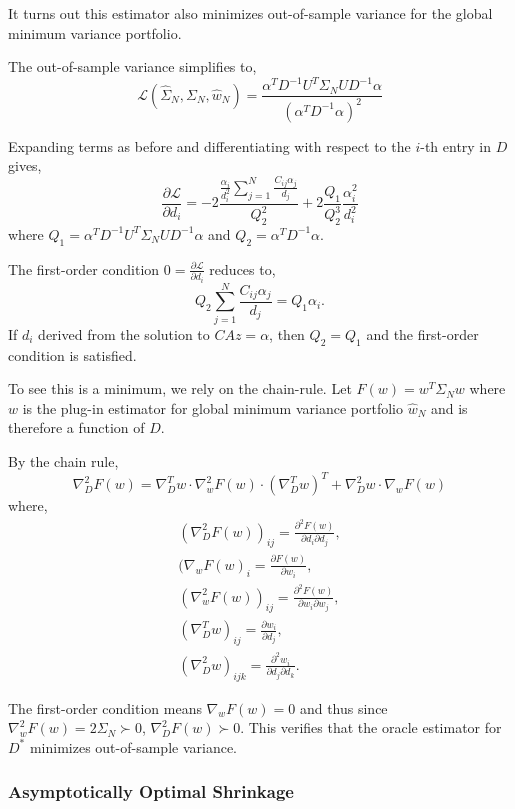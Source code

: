 \documentclass{article}
\begin{document}
It turns out this estimator also minimizes out-of-sample variance for the global
minimum variance portfolio.  

The out-of-sample variance simplifies to,
$$
  \mathcal{L}(\hat{\Sigma}_N, \Sigma_N, \hat{w}_N) = \frac
  	{\alpha^T D^{-1} U^T \Sigma_N U D^{-1} \alpha}
  	{\left( \alpha^T D^{-1} \alpha\right)^2}
$$

Expanding terms as before and differentiating with respect to the $i$-th entry
in $D$ gives,
$$
  \frac{\partial\mathcal{L}}{\partial d_i} = -2 \frac
  	{ \frac{\alpha_i}{d_i^2} \sum_{j=1}^N \frac{C_{ij}\alpha_j}{d_j} }{ Q_2^2 }
    + 2\frac{ Q_1 }{ Q_2^3 } \frac{\alpha_i^2}{d_i^2}
$$
where $Q_1 = \alpha^T D^{-1} U^T \Sigma_N U D^{-1} \alpha$ and $Q_2 = \alpha^T
D^{-1} \alpha$.

The first-order condition $0 = \frac{\partial\mathcal{L}}{\partial d_i}$ reduces
to,
$$
  Q_2 \sum_{j=1}^N \frac{C_{ij}\alpha_j}{d_j}
   = Q_1 \alpha_i.
$$
If $d_i$ derived from the solution to $C A z = \alpha$, then $Q_2 = Q_1$ and the
first-order condition is satisfied.

To see this is a minimum, we rely on the chain-rule.  Let $F(w) = w^T \Sigma_N
w$ where $w$ is the plug-in estimator for global minimum variance portfolio
$\hat{w}_N$ and is therefore a function of $D$.

By the chain rule,
$$
	\nabla_D^2 F(w)
		 = \nabla_D^T w \cdot \nabla_w^2 F(w) \cdot (\nabla_D^T w)^T
		 	+ \nabla_D^2 w \cdot \nabla_w F(w)
$$
where,
\begin{gather*}
	(\nabla_D^2 F(w))_{ij} = \frac{\partial^2 F(w)}
																{\partial d_i \partial d_j},\\
	(\nabla_w F(w)_{i} = \frac{\partial F(w)}{\partial w_i},\\	
	(\nabla_w^2 F(w))_{ij} = \frac{\partial^2 F(w)}
																{\partial w_i \partial w_j},\\									
	(\nabla_D^T w)_{ij} = \frac{\partial w_i}{\partial d_j},\\													
	(\nabla_D^2 w)_{ijk} = \frac{\partial^2 w_i}
																{\partial d_j\partial d_k}.
\end{gather*}

The first-order condition means $\nabla_w F(w) = 0$ and thus since $\nabla_w^2
F(w) = 2\Sigma_N \succ 0$, $\nabla_D^2 F(w) \succ 0$.  This verifies that the
oracle estimator for $D^*$ minimizes out-of-sample variance.

\subsubsection{Asymptotically Optimal Shrinkage}
\end{document}
